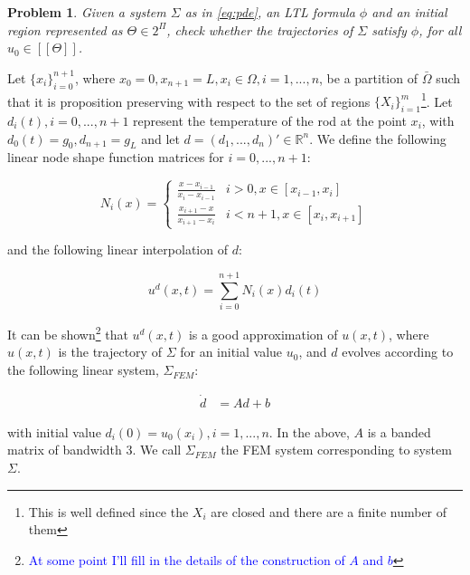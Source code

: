\documentclass{article}
\newtheorem{problem}{Problem}
\newcommand*{\R}{\mathbb{R}}
\newcommand*{\psat}[1]{[[#1]]}
\newcommand*{\fran}[1]{\textcolor{blue}{#1}}
\begin{document}
\begin{problem}\label{pr:pde}
    Given a system $\Sigma$ as in \eqref{eq:pde}, an LTL formula $\phi$ and an
    initial region represented as $\Theta \in 2^\Pi$, check whether the trajectories of $\Sigma$
    satisfy $\phi$, for all $u_0 \in \psat{\Theta}$.
\end{problem}

\fi

Let $\{x_i\}_{i = 0}^{n +
1}$, where $x_0 = 0, x_{n+1} = L, x_i \in \Omega, i = 1,...,n$, be a partition of
$\bar\Omega$ such that it is proposition preserving with respect to the set of
regions $\{X_i\}_{i = 1}^{m}$\footnote{This is well defined since the $X_i$ are
closed and there are a finite number of them}. Let $d_i(t), i = 0,...,n+1$ represent the
temperature of the rod at the point $x_i$, with $d_0(t) = g_0, d_{n+1} = g_L$ and let $d = (d_1, ..., d_n)' \in
\R^n$. We define the following linear node shape function matrices for $i =
0,...,n+1$:

\begin{equation}
    N_i(x) = \begin{cases}
        \frac{x - x_{i - 1}}{x_i - x_{i - 1}} & i > 0, x \in [x_{i-1}, x_i] \\
        \frac{x_{i+1} - x}{x_{i+1} - x_{i}} & i < n+1, x \in [x_{i}, x_{i+1}] 
    \end{cases} 
\end{equation}

and the following linear interpolation of $d$:

\begin{equation}
    u^d(x, t) = \sum_{i=0}^{n+1} N_i(x) d_i(t)
\end{equation}

It can be shown\footnote{\fran{At some point I'll fill in the details of the
construction of $A$ and $b$}} that $u^d(x, t)$ is a good approximation of 
$u(x, t)$, where $u(x,t)$ is the trajectory of $\Sigma$ for an
initial value $u_0$, and $d$ evolves
according to the following linear system, $\Sigma_{FEM}$:

\begin{equation}\label{eq:fem}
    \begin{aligned}
        \dot{d} &= A d + b
    \end{aligned}
\end{equation}

with initial value $d_i(0) = u_0(x_i), i = 1,...,n$. In the above, $A$ is a
banded matrix of bandwidth 3. We call $\Sigma_{FEM}$ the FEM system
corresponding to system $\Sigma$.
\end{document}
